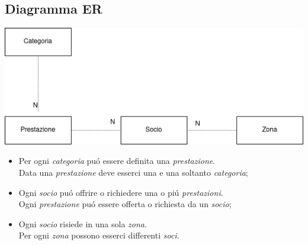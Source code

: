 ﻿\documentclass[a4paper, 12pt]{article}
\begin{document}
\subsection{Diagramma ER}
\begin{center}
\bigskip
\includegraphics[scale=0.5]{img/er.png}    
\end{center}
\medskip
\begin{itemize}
    \item Per ogni \textit{categoria} pu\'o essere definita una \textit{prestazione}.\\Data una \textit{prestazione} deve esserci una e una soltanto \textit{categoria};
    \item Ogni \textit{socio} pu\'o offrire o richiedere una o pi\'u \textit{prestazioni}. \\
    Ogni \textit{prestazione} pu\'o essere offerta o richiesta da un \textit{socio};
    \item Ogni \textit{socio} risiede in una sola \textit{zona}. \\ Per ogni \textit{zona} possono esserci differenti \textit{soci}.
\end{itemize}
\newpage
\end{document}
